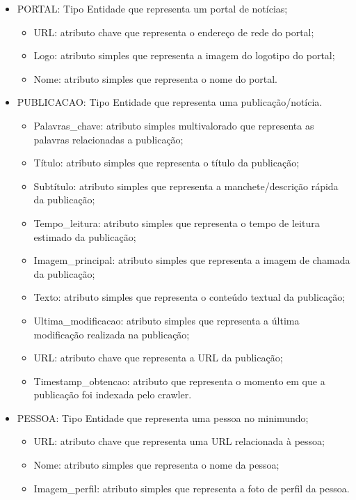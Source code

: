 \begin{itemize}
				\item PORTAL: Tipo Entidade que representa um portal de notícias;

\begin{itemize}
\item URL: atributo chave que representa o endereço de rede do portal;
\item Logo: atributo simples que representa a imagem do logotipo do portal;
\item Nome: atributo simples que representa o nome do portal.
\end{itemize}
\end{itemize}
\begin{itemize}
\item PUBLICACAO: Tipo Entidade que representa uma publicação/notícia.
\begin{itemize}
\item Palavras\_chave: atributo simples multivalorado que representa as palavras relacionadas a publicação;
\item Título: atributo simples que representa o título da publicação;
\item Subtítulo: atributo simples que representa a manchete/descrição rápida da publicação;
\item Tempo\_leitura: atributo simples que representa o tempo de leitura estimado da publicação;
\item Imagem\_principal: atributo simples que representa a imagem de chamada da publicação;
\item Texto: atributo simples que representa o conteúdo textual da publicação;
\item Ultima\_modificacao: atributo simples que representa a última modificação realizada na publicação;
\item URL: atributo chave que representa a URL da publicação;
\item Timestamp\_obtencao: atributo que representa o momento em que a publicação foi indexada pelo crawler.

\end{itemize}
\end{itemize}
\begin{itemize}

\item PESSOA: Tipo Entidade que representa uma pessoa no minimundo;
\begin{itemize}
\item URL: atributo chave que representa uma URL relacionada à pessoa;
\item Nome: atributo simples que representa o nome da pessoa;
\item Imagem\_perfil: atributo simples que representa a foto de perfil da pessoa.
\end{itemize}
\end{itemize}
